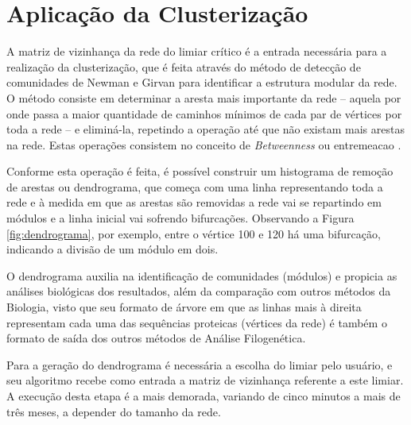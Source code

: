 \section{Aplicação da Clusterização} \label{sec:entremeacao}


A matriz de vizinhança da rede do limiar crítico é a entrada necessária para a realização da clusterização, que é feita através do método de detecção
de comunidades de Newman e Girvan \cite{newman2004} para identificar a estrutura modular da rede. O método consiste em determinar a aresta mais importante
da rede – aquela por onde passa a maior quantidade de caminhos mínimos de cada par de vértices por toda a rede – e eliminá-la, repetindo a operação
até que não existam mais arestas na rede. Estas operações consistem no conceito de \textit{Betweenness} ou \gls{entremeacao} \cite{andrade2008}.

Conforme esta operação é feita, é possível construir um histograma de remoção de arestas ou dendrograma, que começa com uma linha representando toda a rede
e à medida em que as arestas são removidas a rede vai se repartindo em módulos e a linha inicial vai sofrendo bifurcações. Observando a Figura
\ref{fig:dendrograma}, por exemplo, entre o vértice 100 e 120 há uma bifurcação, indicando a divisão de um módulo em dois.

O dendrograma auxilia na identificação de comunidades (módulos) e propicia as análises biológicas dos resultados, além da comparação com outros
métodos da Biologia, visto que seu formato de árvore em que as linhas mais à direita representam cada uma das sequências proteicas (vértices da rede)
é também o formato de saída dos outros métodos de Análise Filogenética. 

Para a geração do dendrograma é necessária a escolha do limiar pelo usuário, e seu algoritmo recebe como entrada a matriz de vizinhança referente a este
limiar. A execução desta etapa é a mais demorada, variando de cinco minutos a mais de três meses, a depender do
tamanho da rede. 

